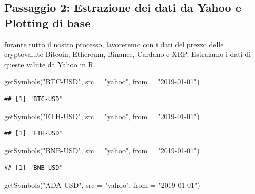 \documentclass[]{tufte-handout}
\newenvironment{Shaded}{}{}
\newcommand{\AttributeTok}[1]{\textcolor[rgb]{0.49,0.56,0.16}{#1}}
\newcommand{\FunctionTok}[1]{\textcolor[rgb]{0.02,0.16,0.49}{#1}}
\newcommand{\NormalTok}[1]{#1}
\newcommand{\StringTok}[1]{\textcolor[rgb]{0.25,0.44,0.63}{#1}}
\begin{document}
\hypertarget{passaggio-2-estrazione-dei-dati-da-yahoo-e-plotting-di-base}{%
\subsection{Passaggio 2: Estrazione dei dati da Yahoo e Plotting di
base}\label{passaggio-2-estrazione-dei-dati-da-yahoo-e-plotting-di-base}}

furante tutto il nostro processo, lavoreremo con i dati del prezzo delle
cryptovalute Bitcoin, Ethereum, Binance, Cardano e XRP. Estraiamo i dati
di queste valute da Yahoo in R.

\begin{Shaded}
\begin{Highlighting}[]
\FunctionTok{getSymbols}\NormalTok{(}\StringTok{"BTC{-}USD"}\NormalTok{, }\AttributeTok{src =} \StringTok{"yahoo"}\NormalTok{, }\AttributeTok{from =} \StringTok{"2019{-}01{-}01"}\NormalTok{)}
\end{Highlighting}
\end{Shaded}

\begin{verbatim}
## [1] "BTC-USD"
\end{verbatim}

\begin{Shaded}
\begin{Highlighting}[]
\FunctionTok{getSymbols}\NormalTok{(}\StringTok{"ETH{-}USD"}\NormalTok{, }\AttributeTok{src =} \StringTok{"yahoo"}\NormalTok{, }\AttributeTok{from =} \StringTok{"2019{-}01{-}01"}\NormalTok{)}
\end{Highlighting}
\end{Shaded}

\begin{verbatim}
## [1] "ETH-USD"
\end{verbatim}

\begin{Shaded}
\begin{Highlighting}[]
\FunctionTok{getSymbols}\NormalTok{(}\StringTok{"BNB{-}USD"}\NormalTok{, }\AttributeTok{src =} \StringTok{"yahoo"}\NormalTok{, }\AttributeTok{from =} \StringTok{"2019{-}01{-}01"}\NormalTok{)}
\end{Highlighting}
\end{Shaded}

\begin{verbatim}
## [1] "BNB-USD"
\end{verbatim}

\begin{Shaded}
\begin{Highlighting}[]
\FunctionTok{getSymbols}\NormalTok{(}\StringTok{"ADA{-}USD"}\NormalTok{, }\AttributeTok{src =} \StringTok{"yahoo"}\NormalTok{, }\AttributeTok{from =} \StringTok{"2019{-}01{-}01"}\NormalTok{)}
\end{Highlighting}
\end{Shaded}
\end{document}
